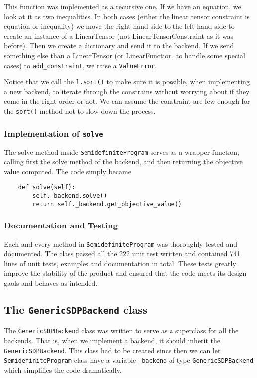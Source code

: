 	This function was implemented as a recursive one. If we have an equation, we look at it as two inequalities. In both cases (either the linear tensor constraint is equation or inequality) we move the right hand side to the left hand side to create an instance of a LinearTensor (not LinearTensorConstraint as it was before). Then we create a dictionary and send it to the backend. If we send something else than a LinearTensor (or LinearFunction, to handle some special cases) to  \texttt{add\_constraint}, we raise a \texttt{ValueError}. 
	
Notice that we call the \texttt{l.sort()} to make sure it is possible, when implementing a new backend, to iterate through the constrains without worrying about if they come in the right order or not. We can assume the constraint are few enough for the \texttt{sort()} method not to slow down the process. 
	
	
	\subsubsection{Implementation of \texttt{solve}}
The solve method inside \texttt{SemidefiniteProgram} serves as a wrapper function, calling first the solve method of the backend, and then returning the objective value computed. The code simply became
\begin{verbatim}
    def solve(self):
        self._backend.solve()
        return self._backend.get_objective_value()
\end{verbatim}


	\subsubsection{Documentation and Testing}
Each and every method in \texttt{SemidefiniteProgram} was thoroughly tested and documented. The class passed all the 222 unit test written and contained 741 lines of unit tests, examples and documentation in total. These tests greatly improve the stability of the product and ensured that the code meets its design gaols and behaves as intended.   



\subsection{The \texttt{GenericSDPBackend} class}
\label{genericsdpbackend}
The \texttt{GenericSDPBackend} class was written to serve as a superclass for all the backends. That is, when we implement a backend, it should inherit the \texttt{GenericSDPBackend}. This class had to be created since then we can let \texttt{SemidefiniteProgram} class have a variable \texttt{\_backend} of type \texttt{GenericSDPBackend} which simplifies the code dramatically.  

